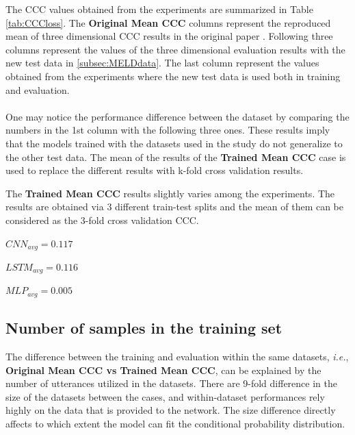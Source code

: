 \documentclass[a4paper,11pt]{article}
\begin{document}
\indent The CCC values obtained from the experiments are summarized in Table \ref{tab:CCCloss}. The \textbf{Original Mean CCC} columns represent the reproduced mean of three dimensional CCC results in the original paper \cite{atmaja2020deep}. Following three columns represent the values of the three dimensional evaluation results with the new test data in \ref{subsec:MELDdata}. The last column represent the values obtained from the experiments where the new test data is used both in training and evaluation.
\\
\\
One may notice the performance difference between the dataset by comparing the numbers in the 1st column with the following three ones. These results imply that the models trained with the datasets used in the study do not generalize to the other test data. The mean of the results of the \textbf{Trained Mean CCC} case is used to replace the different results with k-fold cross validation results. 

The  \textbf{Trained Mean CCC} results slightly varies among the experiments. The results are obtained via 3 different train-test splits and the mean of them can be considered as the 3-fold cross validation CCC. \\

\begin{minipage}{0.3\textwidth}
    \centering
    $CNN_{avg} = 0.117$            
\end{minipage}
\begin{minipage}{0.3\textwidth}
    \centering
    $LSTM_{avg} = 0.116$             
\end{minipage}
\begin{minipage}{0.3\textwidth}
    \centering
   $MLP_{avg} = 0.005$ 
\end{minipage}

\pagebreak 

\subsection{Number of samples in the training set}
The difference between the training and evaluation within the same datasets, \textit{i.e.}, \textbf{Original Mean CCC vs Trained Mean CCC}, can be explained by the number of utterances utilized in the datasets. There are 9-fold difference in the size of the datasets between the cases, and within-dataset performances rely highly on the data that is provided to the network. The size difference directly affects to which extent the model can fit the conditional probability distribution.
\end{document}
